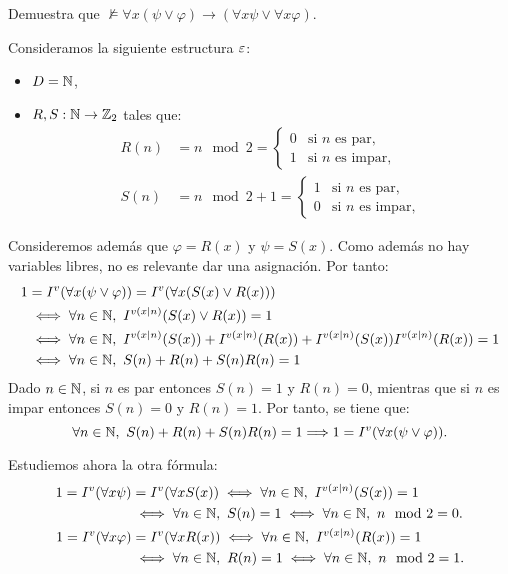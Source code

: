 \begin{ejercicio}\label{ej:2.7}
    Demuestra que $\not\models \forall x(\psi \vee \varphi) \rightarrow (\forall x \psi \vee \forall x \varphi)$.

    Consideramos la siguiente estructura $\varepsilon$:
    \begin{itemize}
        \item $D = \mathbb{N}$,
        \item $R,S:\mathbb{N}\rightarrow\mathbb{Z}_2$ tales que:
        \begin{align*}
            R(n) &= n\mod 2=\begin{cases}
                0 & \text{si }n\text{ es par},\\
                1 & \text{si }n\text{ es impar},
            \end{cases}\\
            S(n) &= n\mod 2+1=\begin{cases}
                1 & \text{si }n\text{ es par},\\
                0 & \text{si }n\text{ es impar},
            \end{cases}
        \end{align*}
    \end{itemize}

    Consideremos además que $\varphi=R(x)$ y $\psi=S(x)$. Como además no hay variables libres, no es relevante dar una asignación. Por tanto:
    \begin{align*}
        1 &= I^v(\forall x(\psi \vee \varphi))= I^v(\forall x(S(x) \vee R(x))) 
        \\&\iff \forall n\in\mathbb{N},\ I^{v(x\mid n)}(S(x) \vee R(x)) = 1\\
        &\iff \forall n\in\mathbb{N},\ I^{v(x\mid n)}(S(x)) + I^{v(x\mid n)}(R(x)) + I^{v(x\mid n)}(S(x))I^{v(x\mid n)}(R(x)) = 1\\
        &\iff \forall n\in\mathbb{N},\ S(n) + R(n) + S(n)R(n) = 1\\
    \end{align*}
    Dado $n\in \mathbb{N}$, si $n$ es par entonces $S(n)=1$ y $R(n)=0$, mientras que si $n$ es impar entonces $S(n)=0$ y $R(n)=1$. Por tanto, se tiene que:
    \begin{equation*}
        \forall n\in\mathbb{N},\ S(n) + R(n) + S(n)R(n) = 1 \Longrightarrow 1=I^v(\forall x(\psi \vee \varphi)).
    \end{equation*}

    Estudiemos ahora la otra fórmula:
    \begin{align*}
        1 = I^v(\forall x \psi)&=I^v(\forall x S(x)) \iff \forall n\in\bb{N},\ I^{v(x\mid n)}(S(x)) = 1\\
        &\iff \forall n\in\bb{N},\ S(n) = 1\iff \forall n\in\bb{N},\ n\mod 2 = 0.\\
        1 = I^v(\forall x \varphi)&=I^v(\forall x R(x)) \iff \forall n\in\bb{N},\ I^{v(x\mid n)}(R(x)) = 1\\
        &\iff \forall n\in\bb{N},\ R(n) = 1\iff \forall n\in\bb{N},\ n\mod 2 = 1.
    \end{align*}


\end{ejercicio}
